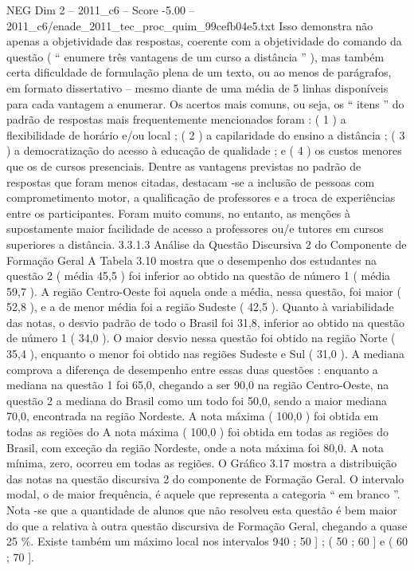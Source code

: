 \begin{textsample}{NEG Dim 2 – 2011\_c6 – Score -5.00 – 2011\_c6/enade\_2011\_tec\_proc\_quim\_99cefb04e5.txt}
Isso demonstra não apenas a objetividade das respostas, coerente com a objetividade do comando da questão ( “ enumere três vantagens de um curso a distância ” ), mas também certa dificuldade de formulação plena de um texto, ou ao menos de parágrafos, em formato dissertativo – mesmo diante de uma média de 5 linhas disponíveis para cada vantagem a enumerar.
Os acertos mais comuns, ou seja, os “ itens ” do padrão de respostas mais frequentemente mencionados foram : ( 1 ) a flexibilidade de horário e/ou local ; ( 2 ) a capilaridade do ensino a distância ; ( 3 ) a democratização do acesso à educação de qualidade ; e ( 4 ) os custos menores que os de cursos presenciais.
Dentre as vantagens previstas no padrão de respostas que foram menos citadas, destacam -se a inclusão de pessoas com comprometimento motor, a qualificação de professores e a troca de experiências entre os participantes.
Foram muito comuns, no entanto, as menções à supostamente maior facilidade de acesso a professores ou/e tutores em cursos superiores a distância. 3.3.1.3 Análise da Questão Discursiva 2 do Componente de Formação Geral A Tabela 3.10 mostra que o desempenho dos estudantes na questão 2 ( média 45,5 ) foi inferior ao obtido na questão de número 1 ( média 59,7 ).
A região Centro-Oeste foi aquela onde a média, nessa questão, foi maior ( 52,8 ), e a de menor média foi a região Sudeste ( 42,5 ).
Quanto à variabilidade das notas, o desvio padrão de todo o Brasil foi 31,8, inferior ao obtido na questão de número 1 ( 34,0 ).
O maior desvio nessa questão foi obtido na região Norte ( 35,4 ), enquanto o menor foi obtido nas regiões Sudeste e Sul ( 31,0 ).
A mediana comprova a diferença de desempenho entre essas duas questões : enquanto a mediana na questão 1 foi 65,0, chegando a ser 90,0 na região Centro-Oeste, na questão 2 a mediana do Brasil como um todo foi 50,0, sendo a maior mediana 70,0, encontrada na região Nordeste.
A nota máxima ( 100,0 ) foi obtida em todas as regiões do A nota máxima ( 100,0 ) foi obtida em todas as regiões do Brasil, com exceção da região Nordeste, onde a nota máxima foi 80,0.
A nota mínima, zero, ocorreu em todas as regiões.
O Gráfico 3.17 mostra a distribuição das notas na questão discursiva 2 do componente de Formação Geral.
O intervalo modal, o de maior frequência, é aquele que representa a categoria “ em branco ”.
Nota -se que a quantidade de alunos que não resolveu esta questão é bem maior do que a relativa à outra questão discursiva de Formação Geral, chegando a quase 25 \%.
Existe também um máximo local nos intervalos 940 ; 50 ] ; ( 50 ; 60 ] e ( 60 ; 70 ].

\end{textsample}
